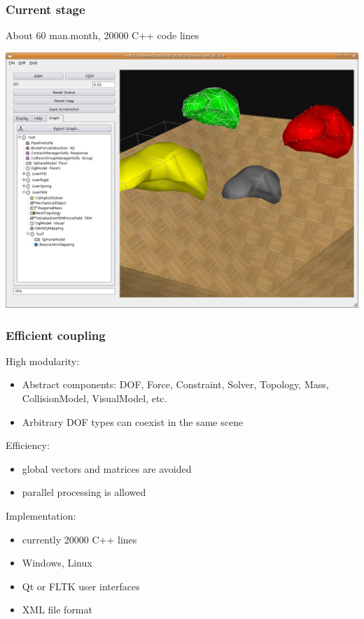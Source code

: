 \documentclass[a4paper,compress]{beamer}
\begin{document}
\begin{frame}
 \frametitle{Current stage}
About 60 man.month, 20000 C++ code lines
\begin{center}
 \includegraphics[width=\linewidth]{snapshotSofa1.png}
\end{center}

\end{frame}


\begin{frame}
 \frametitle{Efficient coupling}
High modularity:
\begin{itemize}
 \item Abstract components: DOF, Force, Constraint, Solver, Topology, Mass, CollisionModel, VisualModel, etc. 
 \item Arbitrary DOF types can coexist in the same scene
\end{itemize}
Efficiency:
\begin{itemize}
 \item global vectors and matrices are avoided
 \item parallel processing is allowed
\end{itemize}
Implementation:
\begin{itemize}
 \item currently 20000 C++ lines
 \item Windows, Linux
 \item Qt or FLTK user interfaces
 \item XML file format
\end{itemize}

\end{frame}
\end{document}
